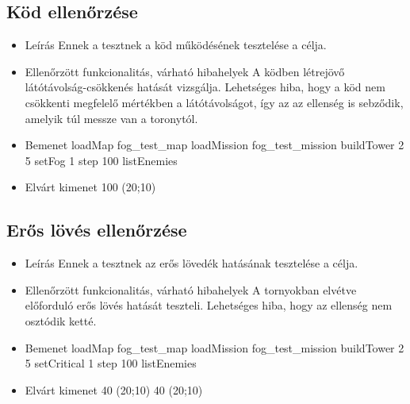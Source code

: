 \subsection{Köd ellenőrzése}
\begin{itemize}
\item Leírás\newline
Ennek a tesztnek a köd működésének tesztelése a célja.
\item Ellenőrzött funkcionalitás, várható hibahelyek\newline
A ködben létrejövő látótávolság-csökkenés hatását vizsgálja. Lehetséges hiba, hogy a köd nem csökkenti megfelelő mértékben a látótávolságot, így az az ellenség is sebződik, amelyik túl messze van a toronytól.
\item Bemenet\newline
loadMap fog\_test\_map\newline
loadMission fog\_test\_mission\newline
buildTower 2 5\newline
setFog 1\newline
step 100\newline
listEnemies\newline
\item Elvárt kimenet 100	(20;10)\newline
\end{itemize}


\subsection{Erős lövés ellenőrzése}
\begin{itemize}
\item Leírás\newline
Ennek a tesztnek az erős lövedék hatásának tesztelése a célja.
\item Ellenőrzött funkcionalitás, várható hibahelyek\newline
A tornyokban elvétve előforduló erős lövés hatását teszteli. Lehetséges hiba, hogy az ellenség nem osztódik ketté.
\item Bemenet\newline
loadMap fog\_test\_map\newline
loadMission fog\_test\_mission\newline
buildTower 2 5\newline
setCritical 1
step 100\newline
listEnemies\newline
\item Elvárt kimenet 40	(20;10) 40	(20;10)\newline
\end{itemize}

